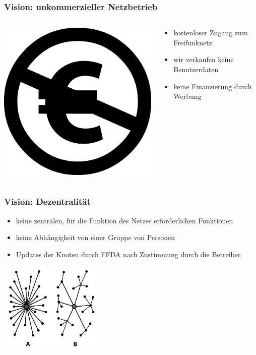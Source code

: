 \documentclass[10pt,handout]{beamer}
\begin{document}
\begin{frame}
	\frametitle{Vision: unkommerzieller Netzbetrieb}
	\begin{columns}[c]
		\begin{column}{4cm}
			\includegraphics[width=\textwidth]{images/non-commercial-eu}
		\end{column}
		\begin{column}{8cm}
			\begin{itemize}[<+->]
				\item kostenloser Zugang zum Freifunknetz
				\item wir verkaufen keine Benutzerdaten
				\item keine Finanzierung durch Werbung
			\end{itemize}
		\end{column}
	\end{columns}	
\end{frame}

\begin{frame}
	\frametitle{Vision: Dezentralität}
	
	\begin{itemize}[<+->]
		\item keine zentralen, für die Funktion des Netzes erforderlichen Funktionen
		\item keine Abhängigkeit von einer Gruppe von Personen
		\item Updates der Knoten durch FFDA nach Zustimmung durch die Betreiber
	\end{itemize}
	\centering
	\vfill
	\includegraphics[width=5cm]{images/decentral}
\end{frame}
\end{document}
